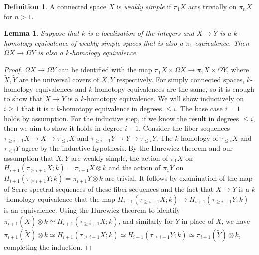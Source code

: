 \documentclass[12 pt]{amsart}
\theoremstyle{plain}
\newtheorem{lemma}[theorem]{Lemma}
\theoremstyle{definition}
\newtheorem{definition}[theorem]{Definition}
\theoremstyle{remark}
\numberwithin{equation}{section}
\begin{document}
\begin{definition}\label{definition:weaklysimple}
	A connected space $X$ is \textit{weakly simple} if $\pi_1X$ acts trivially on $\pi_nX$ for $n>1$.
\end{definition}

\begin{lemma}\label{lemma:simplespacesloopspace}
	Suppose that $k$ is a localization of the integers and $X \to Y$ is a $k$-homology equivalence of weakly simple spaces that is also a $\pi_1$-equivalence. Then $\Omega X \to \Omega Y$ is also a $k$-homology equivalence.
\end{lemma}

\begin{proof}
	$\Omega X \to \Omega Y$ can be identified with the map $\pi_1X\times
	\Omega \tilde{X} \to \pi_1X \times \Omega \tilde{Y}$, 
	where
	$\tilde{X},\tilde{Y}$ are the universal covers of $X,Y$ respectively.
	For simply connected spaces, $k$-homology equivalences and $k$-homotopy
	equivalences are the same, so it is enough to show that
	$\tilde{X}\to\tilde{Y}$ is a $k$-homotopy equivalence. We will show
	inductively on $i\geq 1$ that it is a $k$-homotopy equivalence in degrees
	$\leq i$. 
	The base case $i = 1$ holds by assumption.
	For the inductive step, if we know the result in degrees $\leq
	i$, then we aim to show it holds in degree $i+1$. Consider the fiber sequences $\tau_{\geq i+1}X \to X \to \tau_{\leq i}X$ and $\tau_{\geq i+1}Y \to Y \to \tau_{\leq i}Y$. The $k$-homology of $\tau_{\leq i}X$ and $\tau_{\leq i}Y$ agree by the inductive hypothesis. By the Hurewicz theorem and our assumption that $X,Y$ are weakly simple, 
	the action of $\pi_1X$ on $H_{i+1}(\tau_{\geq i+1}X;k) = \pi_{i+1}X\otimes k$ and
	the action of $\pi_1Y$ on $H_{i+1}(\tau_{\geq i+1}Y;k) = \pi_{i+1}Y\otimes k$ are trivial. It follows by examination of the map of Serre spectral sequences of these fiber sequences and the fact that $X \to Y$ is a $k$-homology equivalence that the map $H_{i+1}(\tau_{\geq i+1}X;k) \to H_{i+1}(\tau_{\geq i+1}Y;k)$ is an equivalence. 
	Using the Hurewicz theorem to identify
$\pi_{i+1}(\tilde{X})\otimes k \simeq
H_{i+1}(\tau_{\geq i+1}X;k)$, and similarly for $Y$ in place of $X$,
	we have $\pi_{i+1}(\tilde{X})\otimes k \simeq
	H_{i+1}(\tau_{\geq i+1}X;k) \simeq 
H_{i+1}(\tau_{\geq i+1}Y;k)
	\simeq
	\pi_{i+1}(\tilde{Y})\otimes k$, completing the induction.
\end{proof}
\end{document}
